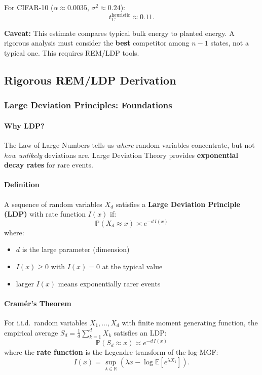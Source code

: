 \documentclass[11pt]{article}
\begin{document}
For CIFAR-10 ($\alpha \approx 0.0035$, $\sigma^2 \approx 0.24$):
\begin{equation}
t_C^{\text{heuristic}} \approx 0.11.
\end{equation}

\textbf{Caveat:} This estimate compares typical bulk energy to planted energy. A rigorous analysis must consider the \textbf{best} competitor among $n-1$ states, not a typical one. This requires REM/LDP tools.

\subsection{Rigorous REM/LDP Derivation}
\subsubsection{Large Deviation Principles: Foundations}
\paragraph{Why LDP?}
The Law of Large Numbers tells us \emph{where} random variables concentrate, but not \emph{how unlikely} deviations are. Large Deviation Theory provides \textbf{exponential decay rates} for rare events.

\paragraph{Definition}
A sequence of random variables $X_d$ satisfies a \textbf{Large Deviation Principle (LDP)} with rate function $I(x)$ if:
\begin{equation}
\mathbb{P}(X_d \approx x) \asymp e^{-d \, I(x)}
\end{equation}
where:
\begin{itemize}
\item $d$ is the large parameter (dimension)
\item $I(x) \geq 0$ with $I(x) = 0$ at the typical value
\item larger $I(x)$ means exponentially rarer events
\end{itemize}

\paragraph{Cram\'er's Theorem}
For i.i.d.\ random variables $X_1, \dots, X_d$ with finite moment generating function, the empirical average $S_d = \frac{1}{d}\sum_{k=1}^d X_k$ satisfies an LDP:
\begin{equation}
\mathbb{P}(S_d \approx x) \asymp e^{-d \, I(x)}
\end{equation}
where the \textbf{rate function} is the Legendre transform of the log-MGF:
\begin{equation}
I(x) = \sup_{\lambda \in \mathbb{R}} \left( \lambda x - \log \mathbb{E}[e^{\lambda X_1}] \right).
\end{equation}
\end{document}
